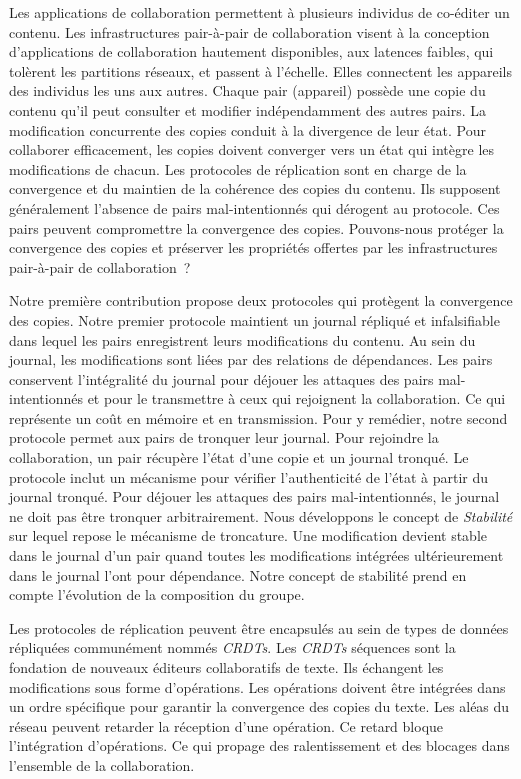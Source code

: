 \begin{ThesisAbstract}
\begin{FrenchAbstract}
Les applications de collaboration permettent à plusieurs individus de co-éditer un contenu.
Les infrastructures pair-à-pair de collaboration visent à la conception d’applications de collaboration hautement disponibles, aux latences faibles, qui tolèrent les partitions
réseaux, et passent à l’échelle.
Elles connectent les appareils des individus les uns aux autres.
Chaque pair (appareil) possède une copie du contenu qu’il peut consulter et modifier indépendamment des autres pairs.
La modification concurrente des copies conduit à la divergence de leur état.
Pour collaborer efficacement, les copies doivent converger vers un état qui intègre les modifications de chacun.
Les protocoles de réplication sont en charge de la convergence et du maintien de la cohérence des copies du contenu.
Ils supposent généralement l'absence de pairs mal-intentionnés qui dérogent au protocole.
Ces pairs peuvent compromettre la convergence des copies.
Pouvons-nous protéger la convergence des copies et préserver les propriétés offertes par les infrastructures pair-à-pair de collaboration~?

Notre première contribution propose deux protocoles qui protègent la convergence des copies.
Notre premier protocole maintient un journal répliqué et infalsifiable dans lequel les pairs enregistrent leurs modifications du contenu.
Au sein du journal, les modifications sont liées par des relations de dépendances.
Les pairs conservent l’intégralité du journal pour déjouer les attaques des pairs mal-intentionnés et pour le transmettre à ceux qui rejoignent la collaboration.
Ce qui représente un coût en mémoire et en transmission.
Pour y remédier, notre second protocole permet aux pairs de tronquer leur journal.
Pour rejoindre la collaboration, un pair récupère l'état d'une copie et un journal tronqué.
Le protocole inclut un mécanisme pour vérifier l'authenticité de l'état à partir du journal tronqué.
Pour déjouer les attaques des pairs mal-intentionnés, le journal ne doit pas être tronquer arbitrairement.
Nous développons le concept de \emph{Stabilité} sur lequel repose le mécanisme de troncature.
Une modification devient stable dans le journal d'un pair quand toutes les modifications intégrées ultérieurement dans le journal l’ont pour dépendance.
Notre concept de stabilité prend en compte l'évolution de la composition du groupe.

Les protocoles de réplication peuvent être encapsulés au sein de types de données répliquées communément nommés \emph{CRDTs}.
Les \emph{CRDTs} séquences sont la fondation de nouveaux éditeurs collaboratifs de texte.
Ils échangent les modifications sous forme d'opérations.
Les opérations doivent être intégrées dans un ordre spécifique pour garantir la convergence des copies du texte.
Les aléas du réseau peuvent retarder la réception d'une opération.
Ce retard bloque l'intégration d'opérations.
Ce qui propage des ralentissement et des blocages dans l'ensemble de la collaboration.


\end{FrenchAbstract}
\end{ThesisAbstract}
